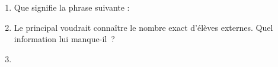 \documentclass[activite]{thedocument}
\begin{document}
    \begin{enumerate}
        \item Que signifie la phrase suivante :\vskip10pt{
            \centering{}
        }\par\dotedline\dotedline\dotedline
        \item Le principal voudrait connaître le nombre exact d'élèves externes.
        Quel information lui manque-il~?
        \dotedline\dotedline\vskip15pt
        \item
    \end{enumerate}
\end{document}
